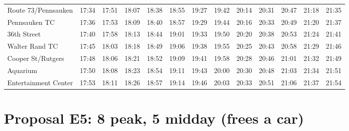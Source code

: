 \begin{center}
\begin{tabular}{@{}lrrrrrrrrrrrr@{}}
Route 73/Pennsauken & 17:34 & 17:51 & 18:07 & 18:38 & 18:55 & 19:27 & 19:42 & 20:14 & 20:31 & 20:47 & 21:18 & 21:35 \\
Pennsauken TC & 17:36 & 17:53 & 18:09 & 18:40 & 18:57 & 19:29 & 19:44 & 20:16 & 20:33 & 20:49 & 21:20 & 21:37 \\
36th Street & 17:40 & 17:58 & 18:13 & 18:44 & 19:01 & 19:33 & 19:50 & 20:20 & 20:38 & 20:53 & 21:24 & 21:41 \\
Walter Rand TC & 17:45 & 18:03 & 18:18 & 18:49 & 19:06 & 19:38 & 19:55 & 20:25 & 20:43 & 20:58 & 21:29 & 21:46 \\
Cooper St/Rutgers & 17:48 & 18:06 & 18:21 & 18:52 & 19:09 & 19:41 & 19:58 & 20:28 & 20:46 & 21:01 & 21:32 & 21:49 \\
Aquarium & 17:50 & 18:08 & 18:23 & 18:54 & 19:11 & 19:43 & 20:00 & 20:30 & 20:48 & 21:03 & 21:34 & 21:51 \\
Entertainment Center & 17:53 & 18:11 & 18:26 & 18:57 & 19:14 & 19:46 & 20:03 & 20:33 & 20:51 & 21:06 & 21:37 & 21:54 \\
\bottomrule\end{tabular}\end{center}
\clearpage
\section{Proposal E5: 8 peak, 5 midday (frees a car)}\label{tt:proposal_E5}
